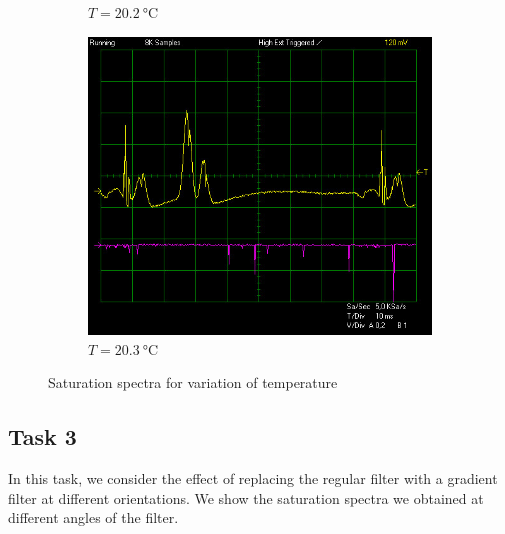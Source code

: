 \documentclass{article}
\begin{document}
\begin{figure}[h]
\begin{subfigure}[b]{0.3\textwidth}
        \caption{$T = \SI{20.2}{\celsius}$}
        \label{fig:202C}
    \end{subfigure}
    \begin{subfigure}[b]{0.3\textwidth}
        \includegraphics[width=\textwidth]{Figures/2/Iconst118mA/203.jpg}
        \caption{$T = \SI{20.3}{\celsius}$}
        \label{fig:203C}
    \end{subfigure}
    \caption{Saturation spectra for variation of temperature}
    \label{fig:VariedTemperature}
\end{figure}

\pagebreak{}

\subsection{Task 3}

In this task, we consider the effect of replacing the regular filter with a gradient filter at different orientations. We show the saturation spectra we obtained at different angles of the filter. 
\end{document}

